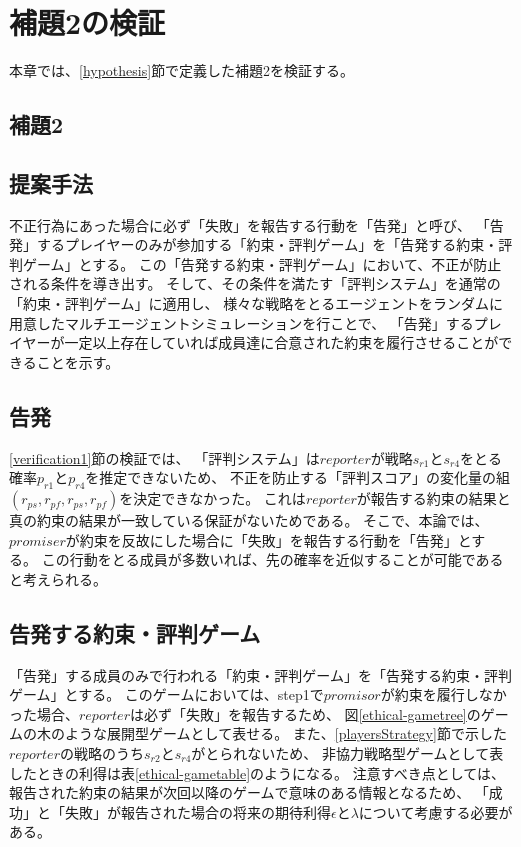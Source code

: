 \chapter{補題2の検証}
本章では、\ref{hypothesis}節で定義した補題2を検証する。

\section{補題2}
\secondLemma

\section{提案手法}
不正行為にあった場合に必ず「失敗」を報告する行動を「告発」と呼び、
「告発」するプレイヤーのみが参加する「約束・評判ゲーム」を「告発する約束・評判ゲーム」とする。
この「告発する約束・評判ゲーム」において、不正が防止される条件を導き出す。
そして、その条件を満たす「評判システム」を通常の「約束・評判ゲーム」に適用し、
様々な戦略をとるエージェントをランダムに用意したマルチエージェントシミュレーションを行ことで、
「告発」するプレイヤーが一定以上存在していれば成員達に合意された約束を履行させることができることを示す。


\section{告発}
\ref{verification1}節の検証では、
「評判システム」は$reporter$が戦略$s_{r1}$と$s_{r4}$をとる確率$p_{r1}$と$p_{r4}$を推定できないため、
不正を防止する「評判スコア」の変化量の組$(r_{ps}, r_{pf}, r_{ps}, r_{pf})$を決定できなかった。
これは$reporter$が報告する約束の結果と真の約束の結果が一致している保証がないためである。
そこで、本論では、$promiser$が約束を反故にした場合に「失敗」を報告する行動を「告発」とする。
この行動をとる成員が多数いれば、先の確率を近似することが可能であると考えられる。


\section{告発する約束・評判ゲーム}
「告発」する成員のみで行われる「約束・評判ゲーム」を「告発する約束・評判ゲーム」とする。
このゲームにおいては、step1で$promisor$が約束を履行しなかった場合、$reporter$は必ず「失敗」を報告するため、
図\ref{ethical-gametree}のゲームの木のような展開型ゲームとして表せる。
また、\ref{playersStrategy}節で示した$reporter$の戦略のうち$s_{r2}$と$s_{r4}$がとられないため、
非協力戦略型ゲームとして表したときの利得は表\ref{ethical-gametable}のようになる。
注意すべき点としては、報告された約束の結果が次回以降のゲームで意味のある情報となるため、
「成功」と「失敗」が報告された場合の将来の期待利得$\epsilon$と$\lambda$について考慮する必要がある。

